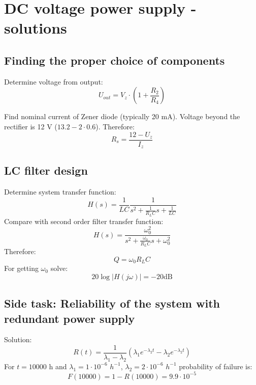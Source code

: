 \documentclass[a4paper]{article}
\begin{document}
\section{DC voltage power supply - solutions}

\subsection{Finding the proper choice of components}
\label{ele:task:1}

Determine voltage from output:
\begin{equation}
U_{out} = V_z \cdot (1 + \frac{R_2}{R_4})
\end{equation}

Find nominal current of Zener diode (typically 20 mA). Voltage beyond the 
rectifier is 12 V ($13.2 - 2 \cdot 0.6$). Therefore:
\begin{equation}
R_s = \frac{12 - U_z}{I_z}
\end{equation}

\subsection{LC filter design}
\label{ele:task:2}
Determine system transfer function:
\begin{equation}
H(s) = \frac{1}{LC} \frac{1}{s^2 + \frac{1}{R_LC} s + \frac{1}{LC}}
\end{equation}
Compare with second order filter transfer function:
\begin{equation}
H(s) = \frac{\omega_0^2}{s^2 + \frac{\omega_0}{R_LC} s + \omega_0^2}
\end{equation}
Therefore:
\begin{equation}
Q = \omega_0 R_L C
\end{equation}
For getting $\omega_0$ solve:
\begin{equation}
20 \log |H(j\omega)| = -20 \text{dB}
\end{equation}

\subsection{Side task: Reliability of the system with redundant power supply} 
\label{ele:task:3}

Solution:
\begin{equation}
R(t) = \frac{1}{\lambda_1 - \lambda_2} (\lambda_1 e^{-\lambda_2 t} - 
\lambda_2 e^{-\lambda_2 t})
\end{equation}
For $t = 10000$ h and $\lambda_1 = 1 \cdot10^{-6}$ $h^{-1}$, 
$\lambda_2 = 2 \cdot10^{-6}$ $h^{-1}$ probability of failure is:
\begin{equation}
F(10000) = 1 - R(10000) = 9.9 \cdot 10^{-5}
\end{equation}
\end{document}
